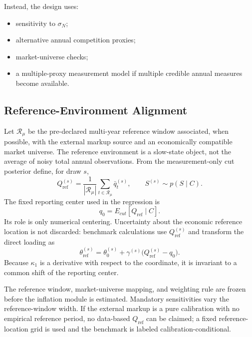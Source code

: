 \documentclass[11pt]{article}
\begin{document}
Instead, the design uses:
\begin{itemize}
\item sensitivity to \(\sigma_N\);
\item alternative annual competition proxies;
\item market-universe checks;
\item a multiple-proxy measurement model if multiple credible annual measures become available.
\end{itemize}

\subsection{Reference-Environment Alignment}

Let $\mathcal R_\mu$ be the pre-declared multi-year reference window associated, when possible, with the external markup source and an economically compatible market universe. The reference environment is a slow-state object, not the average of noisy total annual observations. From the measurement-only cut posterior define, for draw $s$,
\begin{equation}
Q_{\mathrm{ref}}^{(s)}
=
\frac{1}{|\mathcal R_\mu|}
\sum_{t\in\mathcal R_\mu}\bar q_t^{(s)},
\qquad
S^{(s)}\sim p(S\mid C).
\label{eq:q_ref_draw}
\end{equation}
The fixed reporting center used in the regression is
\begin{equation}
q_0=E_{cut}[Q_{\mathrm{ref}}\mid C].
\label{eq:q_reporting_center}
\end{equation}
Its role is only numerical centering. Uncertainty about the economic reference location is not discarded: benchmark calculations use $Q_{\mathrm{ref}}^{(s)}$ and transform the direct loading as
\begin{equation}
\theta_{\mathrm{ref}}^{(s)}
=
\theta_0^{(s)}+\gamma^{(s)}\big(Q_{\mathrm{ref}}^{(s)}-q_0\big).
\label{eq:theta_ref_draw}
\end{equation}
Because $\kappa_1$ is a derivative with respect to the coordinate, it is invariant to a common shift of the reporting center.

The reference window, market-universe mapping, and weighting rule are frozen before the inflation module is estimated. Mandatory sensitivities vary the reference-window width. If the external markup is a pure calibration with no empirical reference period, no data-based $Q_{\mathrm{ref}}$ can be claimed; a fixed reference-location grid is used and the benchmark is labeled calibration-conditional.
\end{document}
